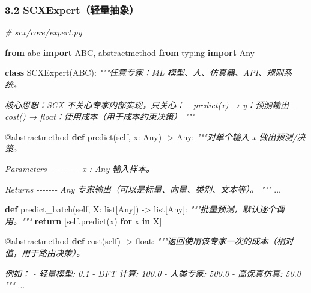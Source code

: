 \documentclass[
  12pt,
]{ctexart}
\newenvironment{Shaded}{}{}
\newcommand{\AttributeTok}[1]{\textcolor[rgb]{0.49,0.56,0.16}{#1}}
\newcommand{\BuiltInTok}[1]{\textcolor[rgb]{0.00,0.50,0.00}{#1}}
\newcommand{\CommentTok}[1]{\textcolor[rgb]{0.38,0.63,0.69}{\textit{#1}}}
\newcommand{\ControlFlowTok}[1]{\textcolor[rgb]{0.00,0.44,0.13}{\textbf{#1}}}
\newcommand{\ImportTok}[1]{\textcolor[rgb]{0.00,0.50,0.00}{\textbf{#1}}}
\newcommand{\KeywordTok}[1]{\textcolor[rgb]{0.00,0.44,0.13}{\textbf{#1}}}
\newcommand{\NormalTok}[1]{#1}
\newcommand{\OperatorTok}[1]{\textcolor[rgb]{0.40,0.40,0.40}{#1}}
\newcommand{\VariableTok}[1]{\textcolor[rgb]{0.10,0.09,0.49}{#1}}
\begin{document}
\subsubsection{3.2
SCXExpert（轻量抽象）}\label{scxexpertux8f7bux91cfux62bdux8c61}

\begin{Shaded}
\begin{Highlighting}[]
\CommentTok{\# scx/core/expert.py}

\ImportTok{from}\NormalTok{ abc }\ImportTok{import}\NormalTok{ ABC, abstractmethod}
\ImportTok{from}\NormalTok{ typing }\ImportTok{import}\NormalTok{ Any}


\KeywordTok{class}\NormalTok{ SCXExpert(ABC):}
    \CommentTok{"""任意专家：ML 模型、人、仿真器、API、规则系统。}

\CommentTok{    核心思想：SCX 不关心专家内部实现，只关心：}
\CommentTok{    {-} predict(x) → y：预测输出}
\CommentTok{    {-} cost() → float：使用成本（用于成本约束决策）}
\CommentTok{    """}

    \AttributeTok{@abstractmethod}
    \KeywordTok{def}\NormalTok{ predict(}\VariableTok{self}\NormalTok{, x: Any) }\OperatorTok{{-}\textgreater{}}\NormalTok{ Any:}
        \CommentTok{"""对单个输入 x 做出预测/决策。}

\CommentTok{        Parameters}
\CommentTok{        {-}{-}{-}{-}{-}{-}{-}{-}{-}{-}}
\CommentTok{        x : Any}
\CommentTok{            输入样本。}

\CommentTok{        Returns}
\CommentTok{        {-}{-}{-}{-}{-}{-}{-}}
\CommentTok{        Any}
\CommentTok{            专家输出（可以是标量、向量、类别、文本等）。}
\CommentTok{        """}
\NormalTok{        ...}

    \KeywordTok{def}\NormalTok{ predict\_batch(}\VariableTok{self}\NormalTok{, X: }\BuiltInTok{list}\NormalTok{[Any]) }\OperatorTok{{-}\textgreater{}} \BuiltInTok{list}\NormalTok{[Any]:}
        \CommentTok{"""批量预测，默认逐个调用。"""}
        \ControlFlowTok{return}\NormalTok{ [}\VariableTok{self}\NormalTok{.predict(x) }\ControlFlowTok{for}\NormalTok{ x }\KeywordTok{in}\NormalTok{ X]}

    \AttributeTok{@abstractmethod}
    \KeywordTok{def}\NormalTok{ cost(}\VariableTok{self}\NormalTok{) }\OperatorTok{{-}\textgreater{}} \BuiltInTok{float}\NormalTok{:}
        \CommentTok{"""返回使用该专家一次的成本（相对值，用于路由决策）。}

\CommentTok{        例如：}
\CommentTok{        {-} 轻量模型: 0.1}
\CommentTok{        {-} DFT 计算: 100.0}
\CommentTok{        {-} 人类专家: 500.0}
\CommentTok{        {-} 高保真仿真: 50.0}
\CommentTok{        """}
\NormalTok{        ...}


\end{Highlighting}
\end{Shaded}
\end{document}
